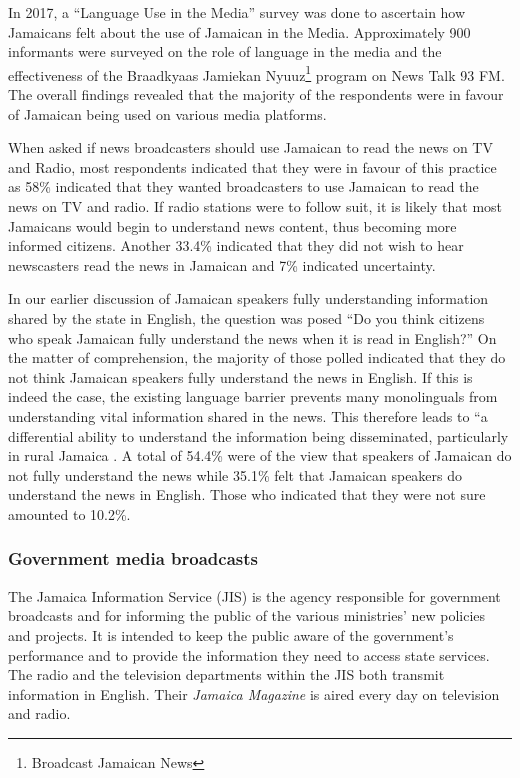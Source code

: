 \documentclass[output=paper,colorlinks,citecolor=brown]{langscibook}
\begin{document}
In 2017, a “Language Use in the Media” survey was done to ascertain how Jamaicans felt about the use of Jamaican in the Media. Approximately 900 informants were surveyed on the role of language in the media and the effectiveness of the Braadkyaas Jamiekan Nyuuz\footnote{Broadcast Jamaican News} program on News Talk 93 FM. The overall findings revealed that the majority of the respondents were in favour of Jamaican being used on various media platforms.

When asked if news broadcasters should use Jamaican to read the news on TV and Radio, most respondents indicated that they were in favour of this practice as 58\% indicated that they wanted broadcasters to use Jamaican to read the news on TV and radio. If radio stations were to follow suit, it is likely that most Jamaicans would begin to understand news content, thus becoming more informed citizens. Another 33.4\% indicated that they did not wish to hear newscasters read the news in Jamaican and 7\% indicated uncertainty. 

In our earlier discussion of Jamaican speakers fully understanding information shared by the state in English, the question was posed “Do you think citizens who speak Jamaican fully understand the news when it is read in English?” On the matter of comprehension, the majority of those polled indicated that they do not think Jamaican speakers fully understand the news in English. If this is indeed the case, the existing language barrier prevents many monolinguals from understanding vital information shared in the news. This therefore leads to “a differential ability to understand the information being disseminated, particularly in rural Jamaica \citep[42]{Justus1978}. A total of 54.4\% were of the view that speakers of Jamaican do not fully understand the news while 35.1\% felt that Jamaican speakers do understand the news in English. Those who indicated that they were not sure amounted to 10.2\%. 

\subsubsection{Government media broadcasts}

The Jamaica Information Service (JIS) is the agency responsible for government broadcasts and for informing the public of the various ministries’ new policies and projects. It is intended to keep the public aware of the government’s performance and to provide the information they need to access state services. The radio and the television departments within the JIS both transmit information in English. Their \textit{Jamaica Magazine} is aired every day on television and radio. 
\end{document}
